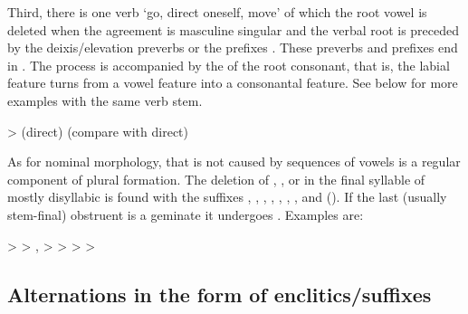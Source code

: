 Third, there is one verb `go, direct oneself, move' of which the root vowel  is deleted when the  agreement is masculine singular and the verbal root is preceded by the deixis/elevation preverbs or the  prefixes . These preverbs and prefixes end in . The process is accompanied by the  of the root consonant, that is, the labial feature turns from a vowel feature into a consonantal feature. See  below for more examples with the same verb stem.
%
\begin{exe}
	\ex	{} >  \newline\hspace*{1em}(direct) (compare with  direct)	\label{ex:habulqan phon}
\end{exe}

As for nominal morphology,  that is not caused by sequences of vowels is a regular component of plural formation. The deletion of , , or  in the final syllable of mostly disyllabic  is found with the suffixes , , , , , , , and  (). If the last (usually stem-final) obstruent is a geminate it undergoes . Examples are:
%
\begin{exe}
	\ex	\label{ex:vowel syncope nouns phon}
	\begin{xlist}
		\ex	{} >  
		\ex	{} >  ,
		\ex	{} >  
		\ex	{} >  
		\ex	{} >  
		\ex	{} >  
	\end{xlist}
\end{exe}



\subsection{Alternations in the form of enclitics\slash suffixes}
\label{ssec:Alternations in the form of enclitics / suffixes}

